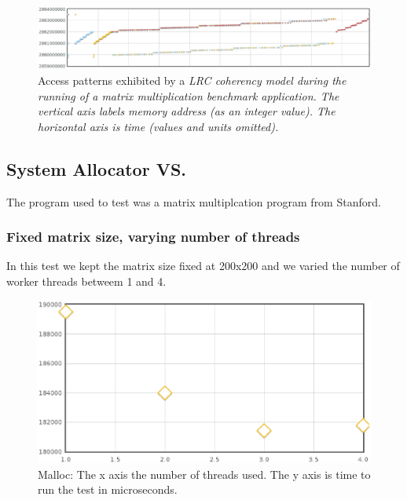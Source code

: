 \begin{figure}[t]
\centering
\includegraphics[scale=0.40]{images/access-patterns-rc.eps}
\caption{Access patterns exhibited by a \em LRC \em coherency model during the running of a matrix multiplication benchmark application.  The vertical axis labels memory address (as an integer value).  The horizontal axis is time (values and units omitted).}
\label{access-patters-rc}
\end{figure}



\subsection{System Allocator VS. \projname{}}

The program used to test was a matrix multiplcation program from Stanford.

\subsubsection{Fixed matrix size, varying number of threads}

In this test we kept the matrix size fixed at 200x200 and we varied the number of worker threads betweem 1 and 4.

\begin{figure}[!h]
\centering
\includegraphics[scale=0.40]{images/malloc-fixed-matrix.eps}
\caption{Malloc: The x axis the number of threads used. The y axis is time to run the test in microseconds.}
\end{figure}

